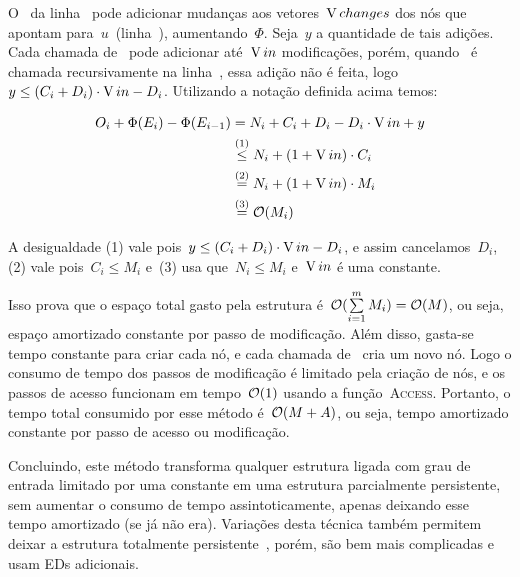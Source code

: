 \documentclass[main.tex]{subfiles}
\begin{document}
O~ da linha~ pode adicionar mudanças aos vetores~$\operatorname{V}{changes}$ dos nós que apontam para~$u$~(linha~), aumentando~$\Phi$. Seja~$y$ a quantidade de tais adições. Cada chamada de~\textsc{} pode adicionar até~$\operatorname{V}{in}$ modificações, porém, quando~\textsc{} é chamada recursivamente na linha~, essa adição não é feita, logo~$y \leq (C_i + D_i) \cdot \operatorname{V}{in} - D_i$. Utilizando a notação definida acima temos:

\begin{align*}
	O_i + \Phi(E_i) - \Phi(E_{i-1}) & = N_i + C_i + D_i - D_i \cdot \operatorname{V}{in} + y
	\\ &\stackrel{\text{(1)}}{\leq} N_i + (1 + \operatorname{V}{in})\cdot C_i
	\\ &\stackrel{\text{(2)}}{=} N_i + (1 + \operatorname{V}{in}) \cdot M_i
	\\ &\stackrel{\text{(3)}}{=} \mathcal{O}(M_i)
\end{align*}

A desigualdade (1) vale pois~$y \leq (C_i + D_i) \cdot \operatorname{V}{in} - D_i$, e assim cancelamos~$D_i$, (2) vale pois~$C_i \leq M_i$ e~(3) usa que~$N_i \leq M_i$ e~$\operatorname{V}{in}$ é uma constante.

Isso prova que o espaço total gasto pela estrutura é~${\mathcal{O}(\sum\limits_{i=1}^m{M_i}) = \mathcal{O}(M)}$, ou seja, espaço amortizado constante por passo de modificação. Além disso, gasta-se tempo constante para criar cada nó, e cada chamada de~\textsc{} cria um novo nó. Logo o consumo de tempo dos passos de modificação é limitado pela criação de nós, e os passos de acesso funcionam em tempo~$\mathcal{O}(1)$ usando a função~\textsc{Access}. Portanto, o tempo total consumido por esse método é~$\mathcal{O}(M+A)$, ou seja, tempo amortizado constante por passo de acesso ou modificação.

Concluindo, este método transforma qualquer estrutura ligada com grau de entrada limitado por uma constante em uma estrutura parcialmente persistente, sem aumentar o consumo de tempo assintoticamente, apenas deixando esse tempo amortizado (se já não era). Variações desta técnica também permitem deixar a estrutura totalmente persistente~\cite{DriscollSST1989}, porém, são bem mais complicadas e usam EDs adicionais.
\end{document}
